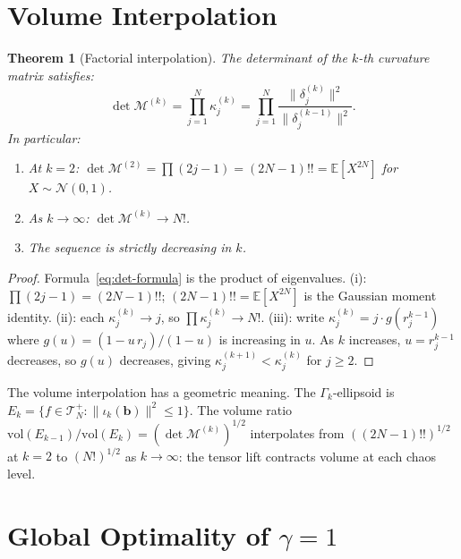 \documentclass[11pt,a4paper]{article}
\theoremstyle{plain}
\newtheorem{theorem}{Theorem}[section]
\theoremstyle{definition}
\theoremstyle{remark}
\newcommand{\E}{\mathbb{E}}
\begin{document}
\section{Volume Interpolation}\label{sec:volume}

\begin{theorem}[Factorial interpolation]
\label{thm:volume}
The determinant of the $k$-th curvature matrix satisfies:
\begin{equation}\label{eq:det-formula}
  \det \mathcal{M}^{(k)}
  = \prod_{j=1}^N \kappa_j^{(k)}
  = \prod_{j=1}^N
    \frac{\|\delta_j^{(k)}\|^2}{\|\delta_j^{(k-1)}\|^2}.
\end{equation}
In particular:
\begin{enumerate}[label=\textup{(\roman*)}]
\item At $k = 2$:
  $\det \mathcal{M}^{(2)} = \prod(2j-1) = (2N{-}1)!!
  = \E[X^{2N}]$ for $X \sim \mathcal{N}(0,1)$.
\item As $k \to \infty$:
  $\det \mathcal{M}^{(k)} \to N!$.
\item The sequence is strictly decreasing in $k$.
\end{enumerate}
\end{theorem}

\begin{proof}
Formula~\eqref{eq:det-formula} is the product of
eigenvalues.
(i): $\prod(2j-1) = (2N{-}1)!!$;
$(2N{-}1)!! = \E[X^{2N}]$ is the Gaussian moment identity.
(ii): each $\kappa_j^{(k)} \to j$, so
$\prod \kappa_j^{(k)} \to N!$.
(iii): write $\kappa_j^{(k)} = j \cdot g(r_j^{k-1})$
where $g(u) = (1-u\,r_j)/(1-u)$ is increasing in $u$.
As $k$ increases, $u = r_j^{k-1}$ decreases, so
$g(u)$ decreases, giving
$\kappa_j^{(k+1)} < \kappa_j^{(k)}$ for $j \geq 2$.
\end{proof}

The volume interpolation has a geometric meaning.
The $\Gamma_k$-ellipsoid is
$E_k = \{f \in \mathcal{T}_N^+ :
\|\iota_k(\mathbf{b})\|^2 \leq 1\}$.
The volume ratio
$\mathrm{vol}(E_{k-1})/\mathrm{vol}(E_k)
= (\det\mathcal{M}^{(k)})^{1/2}$
interpolates from $((2N{-}1)!!)^{1/2}$ at $k = 2$
to $(N!)^{1/2}$ as $k \to \infty$:
the tensor lift contracts volume at each chaos level.


\section{Global Optimality of $\gamma = 1$}
\label{sec:optimality}
\end{document}
